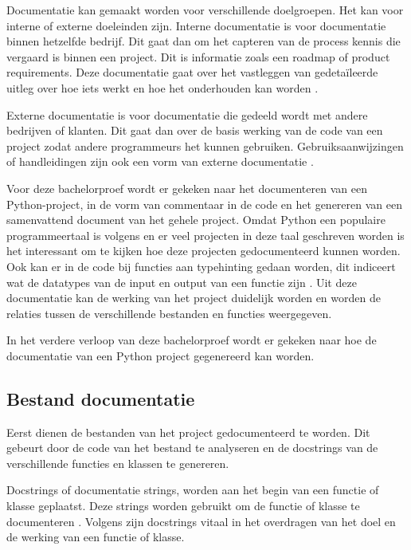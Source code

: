 Documentatie kan gemaakt worden voor verschillende doelgroepen. Het kan voor interne of externe doeleinden zijn.
Interne documentatie is voor documentatie binnen hetzelfde bedrijf.
Dit gaat dan om het capteren van de process kennis die vergaard is binnen een project. Dit is informatie zoals een roadmap of product requirements. 
Deze documentatie gaat over het vastleggen van gedetaïleerde uitleg over hoe iets werkt en hoe het onderhouden kan worden \autocite{swimm.io2024}.

Externe documentatie is voor documentatie die gedeeld wordt met andere bedrijven of klanten. 
Dit gaat dan over de basis werking van de code van een project zodat andere programmeurs het kunnen gebruiken.
Gebruiksaanwijzingen of handleidingen zijn ook een vorm van externe documentatie \autocite{swimm.io2024}.

Voor deze bachelorproef wordt er gekeken naar het documenteren van een Python-project, in de vorm van commentaar in de code en het genereren van een samenvattend document van het gehele project.
Omdat Python een populaire programmeertaal is volgens \textcite{TIOBE2024} en er veel projecten in deze taal geschreven worden is het interessant om te kijken hoe deze projecten gedocumenteerd kunnen worden.
Ook kan er in de code bij functies aan typehinting gedaan worden, dit indiceert wat de datatypes van de input en output van een functie zijn \autocite{Bailey2024}.
Uit deze documentatie kan de werking van het project duidelijk worden en worden de relaties tussen de verschillende bestanden en functies weergegeven.

In het verdere verloop van deze bachelorproef wordt er gekeken naar hoe de documentatie van een Python project gegenereerd kan worden.

\subsection{Bestand documentatie}
\label{sec:bestand-documentatie}
Eerst dienen de bestanden van het project gedocumenteerd te worden.
Dit gebeurt door de code van het bestand te analyseren en de docstrings van de verschillende functies en klassen te genereren.

Docstrings of documentatie strings, worden aan het begin van een functie of klasse geplaatst.
Deze strings worden gebruikt om de functie of klasse te documenteren \autocite{GeeksforGeeks2023}.
Volgens \textcite{GeeksforGeeks2023} zijn docstrings vitaal in het overdragen van het doel en de werking van een functie of klasse.

